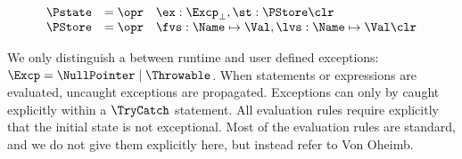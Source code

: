 \[
\begin{array}{rcl}
\Pstate & = \opr & \ex : \Excp_{\bot}, \st : \PStore \clr\\
\PStore & = \opr & \fvs : \Name \mapsto \Val, \lvs : \Name \mapsto \Val \clr
\end{array}
\]


We only distinguish a between runtime and user defined exceptions:
\(\Excp =  \NullPointer \mid \Throwable\). When statements or
expressions are evaluated, uncaught exceptions are
propagated. Exceptions can only by caught explicitly within a
\(\TryCatch\) statement. All evaluation rules require explicitly that
the initial state is not exceptional. Most of the evaluation rules are
standard, and we do not give them explicitly here, but instead refer
to Von Oheimb. 

\begin{figure}[t]
\[
\begin{array}{c}

\end{array}\]
\end{figure}
